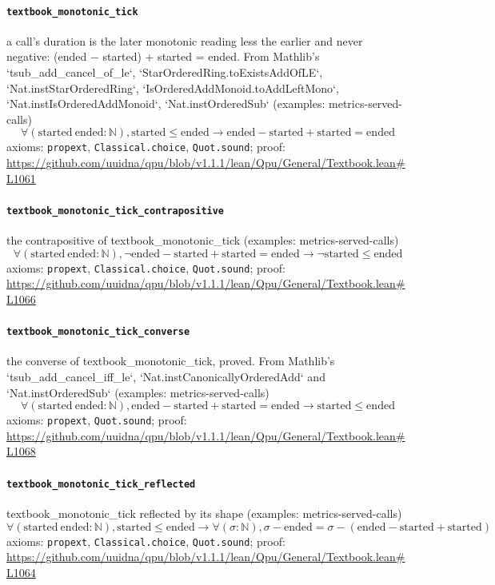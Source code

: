 \documentclass[11pt]{article}
\begin{document}
\paragraph{\texttt{textbook\_monotonic\_tick}}
a call's duration is the later monotonic reading less the earlier and never negative: (ended − started) + started = ended. From Mathlib's `tsub\_add\_cancel\_of\_le`, `StarOrderedRing.toExistsAddOfLE`, `Nat.instStarOrderedRing`, `IsOrderedAddMonoid.toAddLeftMono`, `Nat.instIsOrderedAddMonoid`, `Nat.instOrderedSub` (examples: metrics-served-calls)
\[ \forall (\mathrm{started}\ \mathrm{ended} : \mathbb{N}), \mathrm{started} \le \mathrm{ended} \to \mathrm{ended} - \mathrm{started} + \mathrm{started} = \mathrm{ended} \]
\noindent axioms: \texttt{propext}, \texttt{Classical.choice}, \texttt{Quot.sound}; proof: \url{https://github.com/uuidna/qpu/blob/v1.1.1/lean/Qpu/General/Textbook.lean\#L1061}

\paragraph{\texttt{textbook\_monotonic\_tick\_contrapositive}}
the contrapositive of textbook\_monotonic\_tick (examples: metrics-served-calls)
\[ \forall (\mathrm{started}\ \mathrm{ended} : \mathbb{N}), \neg \mathrm{ended} - \mathrm{started} + \mathrm{started} = \mathrm{ended} \to \neg \mathrm{started} \le \mathrm{ended} \]
\noindent axioms: \texttt{propext}, \texttt{Classical.choice}, \texttt{Quot.sound}; proof: \url{https://github.com/uuidna/qpu/blob/v1.1.1/lean/Qpu/General/Textbook.lean\#L1066}

\paragraph{\texttt{textbook\_monotonic\_tick\_converse}}
the converse of textbook\_monotonic\_tick, proved. From Mathlib's `tsub\_add\_cancel\_iff\_le`, `Nat.instCanonicallyOrderedAdd` and `Nat.instOrderedSub` (examples: metrics-served-calls)
\[ \forall (\mathrm{started}\ \mathrm{ended} : \mathbb{N}), \mathrm{ended} - \mathrm{started} + \mathrm{started} = \mathrm{ended} \to \mathrm{started} \le \mathrm{ended} \]
\noindent axioms: \texttt{propext}, \texttt{Quot.sound}; proof: \url{https://github.com/uuidna/qpu/blob/v1.1.1/lean/Qpu/General/Textbook.lean\#L1068}

\paragraph{\texttt{textbook\_monotonic\_tick\_reflected}}
textbook\_monotonic\_tick reflected by its shape (examples: metrics-served-calls)
\[ \forall (\mathrm{started}\ \mathrm{ended} : \mathbb{N}), \mathrm{started} \le \mathrm{ended} \to \forall (\sigma : \mathbb{N}), \sigma - \mathrm{ended} = \sigma - (\mathrm{ended} - \mathrm{started} + \mathrm{started}) \]
\noindent axioms: \texttt{propext}, \texttt{Classical.choice}, \texttt{Quot.sound}; proof: \url{https://github.com/uuidna/qpu/blob/v1.1.1/lean/Qpu/General/Textbook.lean\#L1064}
\end{document}
